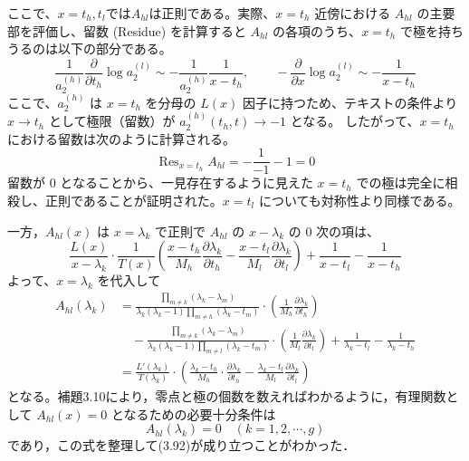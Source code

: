 ここで、$x=t_{h},t_{l}ではA_{hl}$は正則である。実際、$x=t_h$ 近傍における $A_{hl}$ の主要部を評価し、留数 (Residue) を計算すると
$A_{hl}$ の各項のうち、$x=t_h$ で極を持ちうるのは以下の部分である。
\begin{equation*}
    \frac{1}{a_2^{(h)}} \frac{\partial}{\partial t_h} \log a_2^{(l)} \sim - \frac{1}{a_2^{(h)}} \frac{1}{x-t_h}, \qquad - \frac{\partial}{\partial x} \log a_2^{(l)} \sim - \frac{1}{x-t_h}
\end{equation*}
ここで、$a_2^{(h)}$ は $x=t_h$ を分母の $L(x)$ 因子に持つため、テキストの条件より $x \to t_h$ として極限（留数）が $a_2^{(h)}(t_h, t) \to -1$ となる。
したがって、$x=t_h$ における留数は次のように計算される。
\begin{equation*}
    \mathop{\mathrm{Res}}_{x=t_h} A_{hl} = - \frac{1}{-1} - 1 = 0
\end{equation*}
留数が $0$ となることから、一見存在するように見えた $x=t_h$ での極は完全に相殺し、正則であることが証明された。$x=t_l$ についても対称性より同様である。

\begin{story}
一方，$A_{hl}(x)$ は $x=\lambda_k$ で正則で
$A_{hl}$ の $x-\lambda_k$ の $0$ 次の項は、
\begin{equation*}
    \frac{L(x)}{x-\lambda_k} \cdot \frac{1}{T(x)} \left( \frac{x-t_h}{M_h} \frac{\partial \lambda_k}{\partial t_h} - \frac{x-t_l}{M_l} \frac{\partial \lambda_k}{\partial t_l} \right) + \frac{1}{x-t_l} - \frac{1}{x-t_h}
\end{equation*}
よって、$x=\lambda_k$ を代入して
\begin{align*}
    A_{hl}(\lambda_k) &= \frac{\prod_{m \neq k} (\lambda_k - \lambda_m)}{\lambda_k(\lambda_k-1)\prod_{m \neq h} (\lambda_k - t_m)} \cdot \left( \frac{1}{M_h} \frac{\partial \lambda_k}{\partial t_h} \right) \\
    &\quad - \frac{\prod_{m \neq k} (\lambda_k - \lambda_m)}{\lambda_k(\lambda_k-1)\prod_{m \neq l} (\lambda_k - t_m)} \cdot \left( \frac{1}{M_l} \frac{\partial \lambda_k}{\partial t_l} \right) + \frac{1}{\lambda_k - t_l} - \frac{1}{\lambda_k - t_h} \\[8pt]
    &= \frac{L'(\lambda_k)}{T(\lambda_k)} \cdot \left( \frac{\lambda_k-t_h}{M_h} \cdot \frac{\partial \lambda_k}{\partial t_h} - \frac{\lambda_k-t_l}{M_l} \frac{\partial \lambda_k}{\partial t_l} \right)
\end{align*}
となる。補題3.10により，零点と極の個数を数えればわかるように，有理関数として $A_{hl}(x) = 0$ となるための必要十分条件は
\begin{equation*}
    A_{hl}(\lambda_k) = 0 \quad (k = 1, 2, \cdots, g)
\end{equation*}
であり，この式を整理して(3.92)が成り立つことがわかった．
\end{story}

